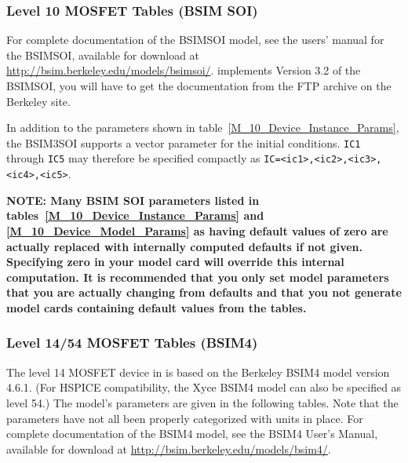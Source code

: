 \clearpage
\subsubsection{Level 10 MOSFET Tables (BSIM SOI)}
For complete documentation of the BSIMSOI model, see the users' manual
for the BSIMSOI, available for download at
\url{http://bsim.berkeley.edu/models/bsimsoi/}.
\Xyce{} implements Version 3.2 of the BSIMSOI, you will have to get the
documentation from the FTP archive on the Berkeley site.

In addition to the parameters shown in table~\ref{M_10_Device_Instance_Params}, 
the BSIM3SOI supports a vector parameter for the initial conditions.    \texttt{IC1} through \texttt{IC5}
may therefore be specified compactly as \texttt{IC=<ic1>,<ic2>,<ic3>, <ic4>,<ic5>}.

\textbf{NOTE:  Many BSIM SOI parameters listed in
tables~\ref{M_10_Device_Instance_Params} and \ref{M_10_Device_Model_Params} as
having default values of zero are actually replaced with internally computed
defaults if not given.  Specifying zero in your model card will override this
internal computation.  It is recommended that you only set model parameters
that you are actually changing from defaults and that you not generate model
cards containing default values from the tables.}



\clearpage
\subsubsection{Level 14/54 MOSFET Tables (BSIM4)}
The level 14 MOSFET device in \Xyce{} is based on the Berkeley BSIM4 model
version 4.6.1.  (For HSPICE compatibility, the Xyce BSIM4 model can also be
specified as level 54.)  The model's parameters are given in the following
tables.  Note that the parameters have not all been properly categorized with
units in place.  For complete documentation of the BSIM4 model, see the BSIM4
User’s Manual, available for download at
\url{http://bsim.berkeley.edu/models/bsim4/}.




\clearpage
